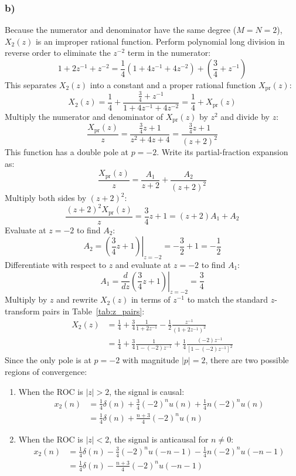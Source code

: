 \documentclass[12pt,a4paper]{article}
\begin{document}
\subsubsection*{b)}
Because the numerator and denominator have the same degree ($M = N = 2$), $X_2(z)$ is an improper rational function. Perform polynomial long division in reverse order to eliminate the $z^{-2}$ term in the numerator:
\[
1 + 2z^{-1} + z^{-2} = \frac{1}{4}(1 + 4z^{-1} + 4z^{-2}) + \left(\frac{3}{4} + z^{-1}\right)
\]
This separates $X_2(z)$ into a constant and a proper rational function $X_{\text{pr}}(z)$:
\[
X_2(z) = \frac{1}{4} + \frac{\frac{3}{4} + z^{-1}}{1 + 4z^{-1} + 4z^{-2}} = \frac{1}{4} + X_{\text{pr}}(z)
\]
Multiply the numerator and denominator of $X_{\text{pr}}(z)$ by $z^2$ and divide by $z$:
\[
\frac{X_{\text{pr}}(z)}{z} = \frac{\frac{3}{4}z + 1}{z^2 + 4z + 4} = \frac{\frac{3}{4}z + 1}{(z + 2)^2}
\]
This function has a double pole at $p = -2$. Write its partial-fraction expansion as:
\[
\frac{X_{\text{pr}}(z)}{z} = \frac{A_1}{z + 2} + \frac{A_2}{(z + 2)^2}
\]
Multiply both sides by $(z + 2)^2$:
\[
\frac{(z + 2)^2 X_{\text{pr}}(z)}{z} = \frac{3}{4}z + 1 = (z + 2)A_1 + A_2
\]
Evaluate at $z = -2$ to find $A_2$:
\[
A_2 = \left. \left(\frac{3}{4}z + 1\right) \right|_{z = -2} = -\frac{3}{2} + 1 = -\frac{1}{2}
\]
Differentiate with respect to $z$ and evaluate at $z = -2$ to find $A_1$:
\[
A_1 = \left. \frac{d}{dz}\left(\frac{3}{4}z + 1\right) \right|_{z = -2} = \frac{3}{4}
\]
Multiply by $z$ and rewrite $X_2(z)$ in terms of $z^{-1}$ to match the standard $z$-transform pairs in Table~\ref{tab:z_pairs}:
\[
\begin{aligned}
X_2(z) &= \frac{1}{4} + \frac{3}{4}\frac{1}{1 + 2z^{-1}} - \frac{1}{2}\frac{z^{-1}}{(1 + 2z^{-1})^2} \\
&= \frac{1}{4} + \frac{3}{4}\frac{1}{1 - (-2)z^{-1}} + \frac{1}{4}\frac{(-2)z^{-1}}{\left[1 - (-2)z^{-1}\right]^2}
\end{aligned}
\]
Since the only pole is at $p = -2$ with magnitude $|p| = 2$, there are two possible regions of convergence:
\begin{enumerate}
\item When the ROC is $|z| > 2$, the signal is causal:
\[
\begin{aligned}
x_2(n) &= \frac{1}{4}\delta(n) + \frac{3}{4}(-2)^n u(n) + \frac{1}{4}n(-2)^n u(n) \\
&= \frac{1}{4}\delta(n) + \frac{n + 3}{4}(-2)^n u(n)
\end{aligned}
\]
\item When the ROC is $|z| < 2$, the signal is anticausal for $n \neq 0$:
\[
\begin{aligned}
x_2(n) &= \frac{1}{4}\delta(n) - \frac{3}{4}(-2)^n u(-n - 1) - \frac{1}{4}n(-2)^n u(-n - 1) \\
&= \frac{1}{4}\delta(n) - \frac{n + 3}{4}(-2)^n u(-n - 1)
\end{aligned}
\]
\end{enumerate}
\end{document}
